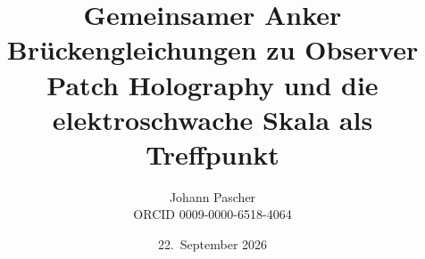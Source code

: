 \documentclass[11pt,a4paper]{report}
\title{Gemeinsamer Anker\\[0.5em]\large Brückengleichungen zu Observer Patch Holography und die elektroschwache Skala als Treffpunkt}
\date{22.~September 2026}
\author{Johann Pascher\\\small ORCID 0009-0000-6518-4064}
\begin{document}
\renewcommand{\thechapter}{}
\renewcommand{\thesection}{\arabic{section}}
\maketitle
\tableofcontents

\end{document}
